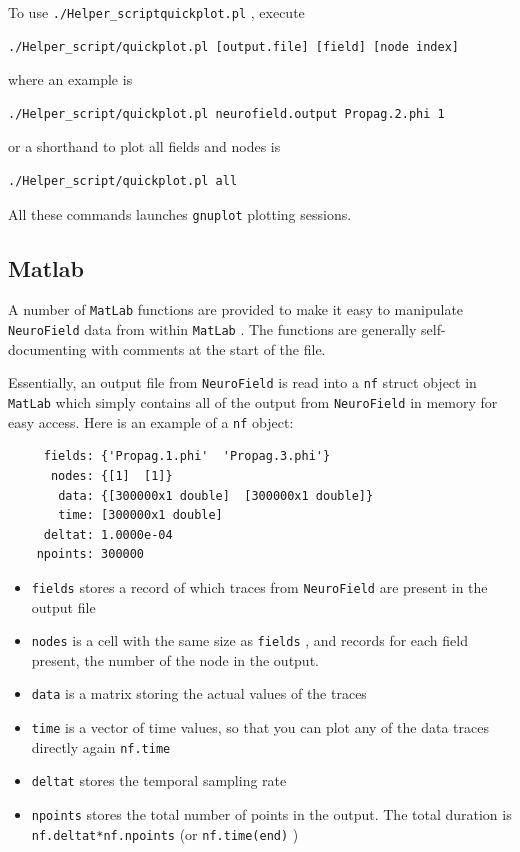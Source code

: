 \documentclass[12pt,a4paper]{article}
\newcommand{\type}[1]{ {\small\small\tt #1} }
\newcommand{\NF}[0]{ \type{NeuroField}}
\begin{document}
To use \type{./Helper\_script\/quickplot.pl}, execute
\begin{lstlisting}
./Helper_script/quickplot.pl [output.file] [field] [node index]
\end{lstlisting}
where an example is
\begin{lstlisting}
./Helper_script/quickplot.pl neurofield.output Propag.2.phi 1
\end{lstlisting}
or a shorthand to plot all fields and nodes is
\begin{lstlisting}
./Helper_script/quickplot.pl all
\end{lstlisting}
All these commands launches \type{gnuplot} plotting sessions.

\subsection{Matlab}
A number of \type{MatLab} functions are provided to make it easy to manipulate \NF data from within \type{MatLab}. The functions are generally self-documenting with comments at the start of the file.

Essentially, an output file from \NF is read into a \type{nf} struct object in \type{MatLab} which simply contains all of the output from \NF in memory for easy access. Here is an example of a \type{nf} object:
\begin{lstlisting}
     fields: {'Propag.1.phi'  'Propag.3.phi'}
      nodes: {[1]  [1]}
       data: {[300000x1 double]  [300000x1 double]}
       time: [300000x1 double]
     deltat: 1.0000e-04
    npoints: 300000
\end{lstlisting}
\begin{itemize}
\item \type{fields} stores a record of which traces from \NF are present in the output file
\item \type{nodes} is a cell with the same size as \type{fields}, and records for each field present, the number of the node in the output. 
\item \type{data} is a matrix storing the actual values of the traces
\item \type{time} is a vector of time values, so that you can plot any of the data traces directly again \type{nf.time}
\item \type{deltat} stores the temporal sampling rate
\item \type{npoints} stores the total number of points in the output. The total duration is \type{nf.deltat*nf.npoints} (or  \type{nf.time(end)})
\end{itemize}
\end{document}
